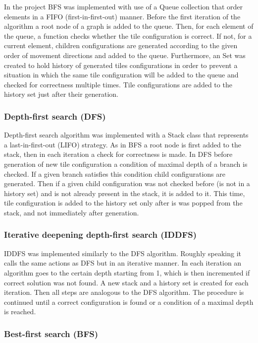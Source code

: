 \documentclass[12pt]{article}
\begin{document}
In the project BFS was implemented with use of a Queue collection that order elements in a FIFO (first-in-first-out) manner. Before the first iteration of the algorithm a root node of a graph is added to the queue. Then, for each element of the queue, a function checks whether the tile configuration is correct. If not, for a current element, children configurations are generated according to the given order of movement directions and added to the queue. Furthermore, an Set was created to hold history of generated tiles configurations in order to prevent a situation in which the same tile configuration will be added to the queue and checked for correctness multiple times. Tile configurations are added to the history set just after their generation.

\subsubsection{Depth-first search (DFS)}

Depth-first search algorithm was implemented with a Stack class that represents a last-in-first-out (LIFO) strategy. As in BFS a root node is first added to the stack, then in each iteration a check for correctness is made. In DFS before generation of new tile configuration a condition of maximal depth of a branch is checked. If a given branch satisfies this condition child configurations are generated. Then if a given child configuration was not checked before (is not in a history set) and is not already present in the stack, it is added to it. This time, tile configuration is added to the history set only after is was popped from the stack, and not immediately after generation.  

\subsubsection{Iterative deepening depth-first search (IDDFS)}

IDDFS was implemented similarly to the DFS algorithm. Roughly speaking it calls the same actions as DFS but in an iterative manner. In each iteration an algorithm goes to the certain depth starting from 1, which is then incremented if correct solution was not found. A new stack and a history set is created for each iteration. Then all steps are analogous to the DFS algorithm. The procedure is continued until a correct configuration is found or a condition of a maximal depth is reached.

 \subsubsection{Best-first search (BFS)}
\end{document}
